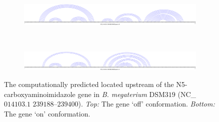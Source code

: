 \begin{figure}[!ht]
\centering
\begin{subfigure}[h]{\textwidth}
\centering
\includegraphics[width=.9\textwidth]{Figures/Ribofinder/NC_014103_1_239188_239400_OFF.pdf}
\end{subfigure} \\
\medskip
\begin{subfigure}[h]{\textwidth}
\centering
\includegraphics[width=.9\textwidth]{Figures/Ribofinder/NC_014103_1_239188_239400_ON.pdf}
\end{subfigure}
\caption[Structures for the putative \rb located upstream of the N5-carboxy\-amino\-imidazole gene in {\em B. megaterium} DSM$319$]{The computationally predicted \rb located upstream of the
N5-carboxy\-amino\-imidazole
gene in {\em B. megaterium} DSM$319$ (NC\_$014103.1$ $239188$--$239400$).
{\em Top:} The gene `off' conformation. {\em Bottom:} The gene `on' conformation.}
\label{fig:figure:NC_014103_1_239188_239400}
\end{figure}
